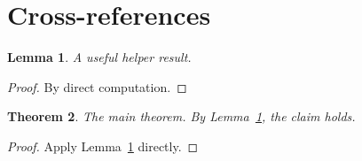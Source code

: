 \documentclass{article}
\newtheorem{theorem}{Theorem}[section]
\newtheorem{lemma}[theorem]{Lemma}
\begin{document}
\section{Cross-references}

\begin{lemma}
\label{lem:helper}
A useful helper result.
\end{lemma}

\begin{proof}
By direct computation.
\end{proof}

\begin{theorem}
\label{thm:uses-lemma}
The main theorem. By Lemma~\ref{lem:helper}, the claim holds.
\end{theorem}

\begin{proof}
Apply Lemma~\ref{lem:helper} directly.
\end{proof}
\end{document}
